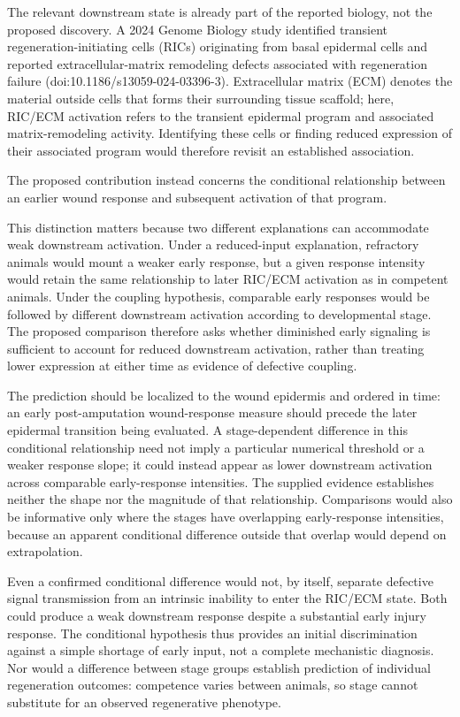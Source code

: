 \documentclass[11pt]{article}
\begin{document}
The relevant downstream state is already part of the reported biology, not the proposed discovery. A 2024 Genome Biology study identified transient regeneration-initiating cells (RICs) originating from basal epidermal cells and reported extracellular-matrix remodeling defects associated with regeneration failure (doi:10.1186/s13059-024-03396-3). Extracellular matrix (ECM) denotes the material outside cells that forms their surrounding tissue scaffold; here, RIC/ECM activation refers to the transient epidermal program and associated matrix-remodeling activity. Identifying these cells or finding reduced expression of their associated program would therefore revisit an established association.

The proposed contribution instead concerns the conditional relationship between an earlier wound response and subsequent activation of that program.

This distinction matters because two different explanations can accommodate weak downstream activation. Under a reduced-input explanation, refractory animals would mount a weaker early response, but a given response intensity would retain the same relationship to later RIC/ECM activation as in competent animals. Under the coupling hypothesis, comparable early responses would be followed by different downstream activation according to developmental stage. The proposed comparison therefore asks whether diminished early signaling is sufficient to account for reduced downstream activation, rather than treating lower expression at either time as evidence of defective coupling.

The prediction should be localized to the wound epidermis and ordered in time: an early post-amputation wound-response measure should precede the later epidermal transition being evaluated. A stage-dependent difference in this conditional relationship need not imply a particular numerical threshold or a weaker response slope; it could instead appear as lower downstream activation across comparable early-response intensities. The supplied evidence establishes neither the shape nor the magnitude of that relationship. Comparisons would also be informative only where the stages have overlapping early-response intensities, because an apparent conditional difference outside that overlap would depend on extrapolation.

Even a confirmed conditional difference would not, by itself, separate defective signal transmission from an intrinsic inability to enter the RIC/ECM state. Both could produce a weak downstream response despite a substantial early injury response. The conditional hypothesis thus provides an initial discrimination against a simple shortage of early input, not a complete mechanistic diagnosis. Nor would a difference between stage groups establish prediction of individual regeneration outcomes: competence varies between animals, so stage cannot substitute for an observed regenerative phenotype.
\end{document}
